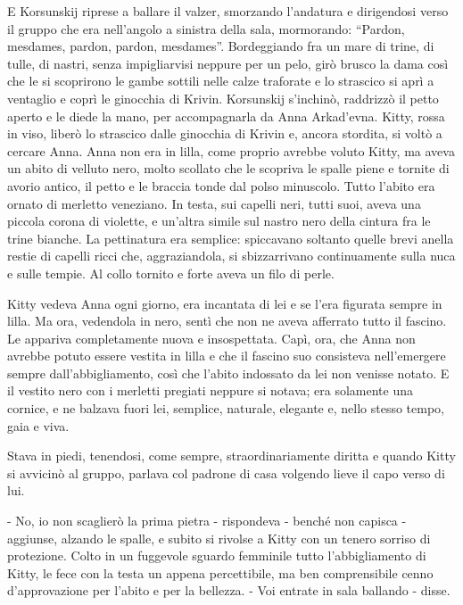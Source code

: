 E Korsunskij riprese a ballare il valzer, smorzando l'andatura e dirigendosi verso il gruppo che era nell'angolo a sinistra della sala, mormorando: ``Pardon, mesdames, pardon, pardon, mesdames''. Bordeggiando fra un mare di trine, di tulle, di nastri, senza impigliarvisi neppure per un pelo, girò brusco la dama così che le si scoprirono le gambe sottili nelle calze traforate e lo strascico si aprì a ventaglio e coprì le ginocchia di Krivin. Korsunskij s'inchinò, raddrizzò il petto aperto e le diede la mano, per accompagnarla da Anna Arkad'evna. Kitty, rossa in viso, liberò lo strascico dalle ginocchia di Krivin e, ancora stordita, si voltò a cercare Anna. Anna non era in lilla, come proprio avrebbe voluto Kitty, ma aveva un abito di velluto nero, molto scollato che le scopriva le spalle piene e tornite di avorio antico, il petto e le braccia tonde dal polso minuscolo. Tutto l'abito era ornato di merletto veneziano. In testa, sui capelli neri, tutti suoi, aveva una piccola corona di violette, e un'altra simile sul nastro nero della cintura fra le trine bianche. La pettinatura era semplice: spiccavano soltanto quelle brevi anella restie di capelli ricci che, aggraziandola, si sbizzarrivano continuamente sulla nuca e sulle tempie. Al collo tornito e forte aveva un filo di perle. 

Kitty vedeva Anna ogni giorno, era incantata di lei e se l'era figurata sempre in lilla. Ma ora, vedendola in nero, sentì che non ne aveva afferrato tutto il fascino. Le appariva completamente nuova e insospettata. Capì, ora, che Anna non avrebbe potuto essere vestita in lilla e che il fascino suo consisteva nell'emergere sempre dall'abbigliamento, così che l'abito indossato da lei non venisse notato. E il vestito nero con i merletti pregiati neppure si notava; era solamente una cornice, e ne balzava fuori lei, semplice, naturale, elegante e, nello stesso tempo, gaia e viva. 

Stava in piedi, tenendosi, come sempre, straordinariamente diritta e quando Kitty si avvicinò al gruppo, parlava col padrone di casa volgendo lieve il capo verso di lui. 

- No, io non scaglierò la prima pietra - rispondeva - benché non capisca - aggiunse, alzando le spalle, e subito si rivolse a Kitty con un tenero sorriso di protezione. Colto in un fuggevole sguardo femminile tutto l'abbigliamento di Kitty, le fece con la testa un appena percettibile, ma ben comprensibile cenno d'approvazione per l'abito e per la bellezza. - Voi entrate in sala ballando - disse. 


